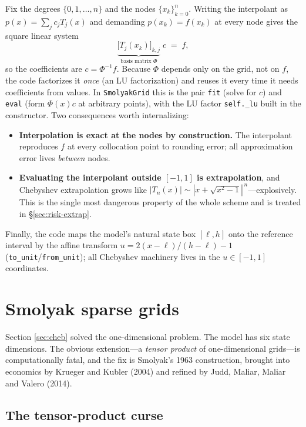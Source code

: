 \documentclass[11pt]{article}
\newcommand{\Tcheb}{T}
\newcommand{\code}[1]{\texttt{#1}}
\begin{document}
Fix the degrees $\{0,1,\dots,n\}$ and the nodes $\{x_k\}_{k=0}^{n}$. Writing
the interpolant as $p(x)=\sum_{j} c_j \Tcheb_j(x)$ and demanding
$p(x_k)=f(x_k)$ at every node gives the square linear system
\begin{equation}
\underbrace{\big[\Tcheb_j(x_k)\big]_{k,j}}_{\text{basis matrix }\Phi}
\; c \;=\; f,
\label{eq:collocation}
\end{equation}
so the coefficients are $c=\Phi^{-1}f$. Because $\Phi$ depends only on the
grid, not on $f$, the code factorizes it \emph{once} (an LU factorization)
and reuses it every time it needs coefficients from values. In
\code{SmolyakGrid} this is the pair \code{fit} (solve for $c$) and
\code{eval} (form $\Phi(x)c$ at arbitrary points), with the LU factor
\code{self.\_lu} built in the constructor. Two consequences worth
internalizing:

\begin{itemize}
\item \textbf{Interpolation is exact at the nodes by construction.} The
      interpolant reproduces $f$ at every collocation point to rounding
      error; all approximation error lives \emph{between} nodes.
\item \textbf{Evaluating the interpolant outside $[-1,1]$ is extrapolation},
      and Chebyshev extrapolation grows like $|\Tcheb_n(x)|\sim
      |x+\sqrt{x^2-1}|^{\,n}$---explosively. This is the single most
      dangerous property of the whole scheme and is treated in
      \S\ref{sec:risk-extrap}.
\end{itemize}

Finally, the code maps the model's natural state box $[\ell,h]$ onto the
reference interval by the affine transform
$u=2(x-\ell)/(h-\ell)-1$ (\code{to\_unit}/\code{from\_unit}); all Chebyshev
machinery lives in the $u\in[-1,1]$ coordinates.


\section{Smolyak sparse grids}
\label{sec:smolyak}

Section \ref{sec:cheb} solved the one-dimensional problem. The model has
six state dimensions. The obvious extension---a \emph{tensor product} of
one-dimensional grids---is computationally fatal, and the fix is Smolyak's
1963 construction, brought into economics by Krueger and Kubler (2004) and
refined by Judd, Maliar, Maliar and Valero (2014).

\subsection{The tensor-product curse}
\end{document}
